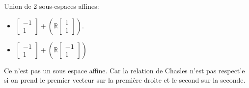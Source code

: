 \documentclass[]{book}
\theoremstyle{definition}
\newcommand{\bb}[1]{\mathbb{#1}}
\newcommand{\R}{\bb{R}}
\begin{document}
Union de 2 sous-espaces affines:
\begin{itemize}
    \item $\begin{bmatrix} -1 \\ 1 \end{bmatrix} + (\R \begin{bmatrix} 1 \\ 1 \end{bmatrix})$.
    \item $\begin{bmatrix} -1 \\ 1 \end{bmatrix} + (\R \begin{bmatrix} -1 \\ 1 \end{bmatrix})$
\end{itemize}
Ce n'est pas un sous espace affine. Car la relation de Chasles n'est pas respect'e si on prend le premier vecteur sur la premi\`ere droite et le second sur la seconde.
\end{document}
